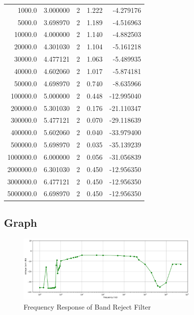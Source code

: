 \documentclass[12pt]{article}
\begin{document}
\begin{table}[h!]
\begin{tabular}{rrrrr}
        1000.0 & 3.000000 &    2 & 1.222 &  -4.279176 \\
        5000.0 & 3.698970 &    2 & 1.189 &  -4.516963 \\
        10000.0 & 4.000000 &    2 & 1.140 &  -4.882503 \\
        20000.0 & 4.301030 &    2 & 1.104 &  -5.161218 \\
        30000.0 & 4.477121 &    2 & 1.063 &  -5.489935 \\
        40000.0 & 4.602060 &    2 & 1.017 &  -5.874181 \\
        50000.0 & 4.698970 &    2 & 0.740 &  -8.635966 \\
        100000.0 & 5.000000 &    2 & 0.448 & -12.995040 \\
        200000.0 & 5.301030 &    2 & 0.176 & -21.110347 \\
        300000.0 & 5.477121 &    2 & 0.070 & -29.118639 \\
        400000.0 & 5.602060 &    2 & 0.040 & -33.979400 \\
        500000.0 & 5.698970 &    2 & 0.035 & -35.139239 \\
        1000000.0 & 6.000000 &    2 & 0.056 & -31.056839 \\
        2000000.0 & 6.301030 &    2 & 0.450 & -12.956350 \\
        3000000.0 & 6.477121 &    2 & 0.450 & -12.956350 \\
        5000000.0 & 6.698970 &    2 & 0.450 & -12.956350 \\
        \hline
    \end{tabular}
\end{table}

\newpage
\subsection{Graph}

\begin{figure}[h]
    \centering
    \includegraphics[width=0.8\textwidth]{BPF_Graph.png}
    \caption{Frequency Response of Band Reject Filter}
\end{figure}
\end{document}

